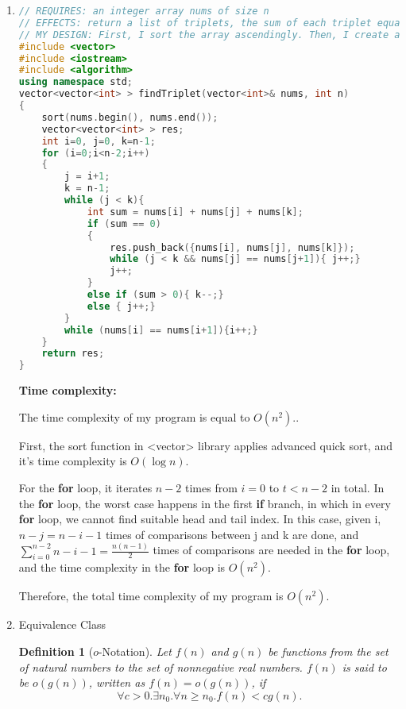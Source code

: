 \documentclass[12pt,a4paper]{article}
\makeatletter
\newtheorem*{solution}{Solution}
\newtheorem{definition}{Definition}
\theoremstyle{definition}
\renewenvironment{solution}[1][Solution] {\par\pushQED{\qed}\normalfont\topsep6\p@\@plus6\p@\relax\trivlist\item[\hskip\labelsep\bfseries#1\@addpunct{.}]\ignorespaces}{\popQED\endtrivlist\@endpefalse} \makeatother
\makeatother
\begin{document}
\begin{enumerate}
\begin{solution}
	\begin{lstlisting}[language=C++]
// REQUIRES: an integer array nums of size n
// EFFECTS: return a list of triplets, the sum of each triplet equals to 0.
// MY DESIGN: First, I sort the array ascendingly. Then, I create a loop from the 1st number to the 2nd last number, and I set two index numbers, one denotes to the 2nd number in each loop and the other denotes to the tail. If the sum of the numbers the three index refers to equals to 0, I push it to the 2D vector; If the sum is greater than 0, I move the tail index forward; If the sum is smaller than 0, I move the front index backward. If the front index is greater or equal to 0 and no sum is fitted, I enter into next loop. 
#include <vector>
#include <iostream>
#include <algorithm>
using namespace std;
vector<vector<int> > findTriplet(vector<int>& nums, int n)
{
	sort(nums.begin(), nums.end());
	vector<vector<int> > res;
	int i=0, j=0, k=n-1;
	for (i=0;i<n-2;i++)
	{
		j = i+1;
		k = n-1;
		while (j < k){
			int sum = nums[i] + nums[j] + nums[k];
			if (sum == 0)
			{
				res.push_back({nums[i], nums[j], nums[k]});
				while (j < k && nums[j] == nums[j+1]){ j++;}
				j++;
			}
			else if (sum > 0){ k--;}
			else { j++;}
		}
		while (nums[i] == nums[i+1]){i++;}
	}
	return res;
}
	\end{lstlisting}
\textbf{Time complexity:}

The time complexity of my program is equal to $O(n^2).$.

First, the sort function  in <vector> library applies advanced quick sort, and it's time complexity is $O(\log n)$. 

For the \textbf{for} loop, it iterates $n-2$ times from $i = 0$ to $t < n-2$ in total. In the \textbf{for} loop, the worst case happens in the first \textbf{if} branch, in which in every \textbf{for} loop, we cannot find suitable head and tail index.  In this case, given i,  $n-j = n - i -1$ times of comparisons between j and k are done, and $\sum_{i=0}^{n-2}n-i-1 = \frac{n(n-1)}{2}$ times of comparisons are needed in the \textbf{for} loop, and the time complexity in the \textbf{for} loop is $O(n^2)$.

Therefore, the total time complexity of my program is $O(n^2)$.
 



\end{solution}

\item Equivalence Class

\begin{definition}[$o$-Notation]
Let $f(n)$ and $g(n)$ be functions from the set of natural numbers to the set of nonnegative real numbers. $f(n)$ is said to be $o(g(n))$, written as $f(n)=o(g(n))$, if
$$\forall c>0.\exists n_{0}.\forall n\ge n_{0}.f(n)<c g(n).$$
\end{definition}


\end{enumerate}
\end{document}
